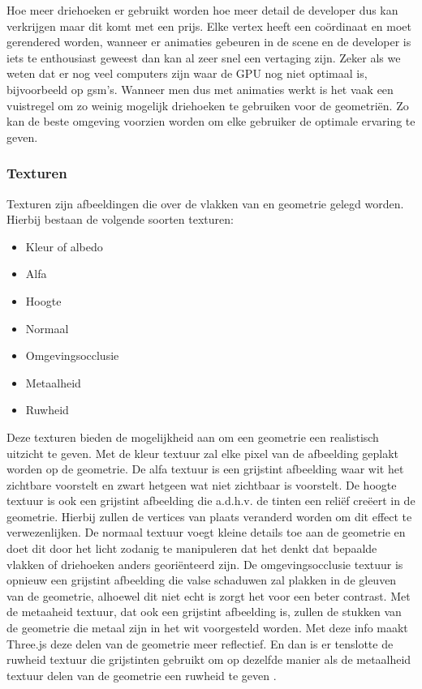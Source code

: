Hoe meer driehoeken er gebruikt worden hoe meer detail de developer dus kan verkrijgen maar dit komt met een prijs. Elke vertex heeft een coördinaat en moet gerendered worden, wanneer er animaties gebeuren in de scene en de developer is iets te enthousiast geweest dan kan al zeer snel een vertaging zijn. Zeker als we weten dat er nog veel computers zijn waar de GPU nog niet optimaal is, bijvoorbeeld op gsm's. Wanneer men dus met animaties werkt is het vaak een vuistregel om zo weinig mogelijk driehoeken te gebruiken voor de geometriën. Zo kan de beste omgeving voorzien worden om elke gebruiker de optimale ervaring te geven.

\subsubsection{Texturen}

Texturen zijn afbeeldingen die over de vlakken van en geometrie gelegd worden. Hierbij bestaan de volgende soorten texturen: 

\begin{itemize}
\item Kleur of albedo
\item Alfa
\item Hoogte
\item Normaal
\item Omgevingsocclusie
\item Metaalheid
\item Ruwheid
\end{itemize}

Deze texturen bieden de mogelijkheid aan om een geometrie een realistisch uitzicht te geven. Met de kleur textuur zal elke pixel van de afbeelding geplakt worden op de geometrie. De alfa textuur is een grijstint afbeelding waar wit het zichtbare voorstelt en zwart hetgeen wat niet zichtbaar is voorstelt. De hoogte textuur is ook een grijstint afbeelding die a.d.h.v. de tinten een reliëf creëert in de geometrie. Hierbij zullen de vertices van plaats veranderd worden om dit effect te verwezenlijken. De normaal textuur voegt kleine details toe aan de geometrie en doet dit door het licht zodanig te manipuleren dat het denkt dat bepaalde vlakken of driehoeken anders georiënteerd zijn. De omgevingsocclusie textuur is opnieuw een grijstint afbeelding die valse schaduwen zal plakken in de gleuven van de geometrie, alhoewel dit niet echt is zorgt het voor een beter contrast. Met de metaaheid textuur, dat ook een grijstint afbeelding is, zullen de stukken van de geometrie die metaal zijn in het wit voorgesteld worden. Met deze info maakt Three.js deze delen van de geometrie meer reflectief. En dan is er tenslotte de ruwheid textuur die grijstinten gebruikt om op dezelfde manier als de metaalheid textuur delen van de geometrie een ruwheid te geven \autocite{Simon2023}.

